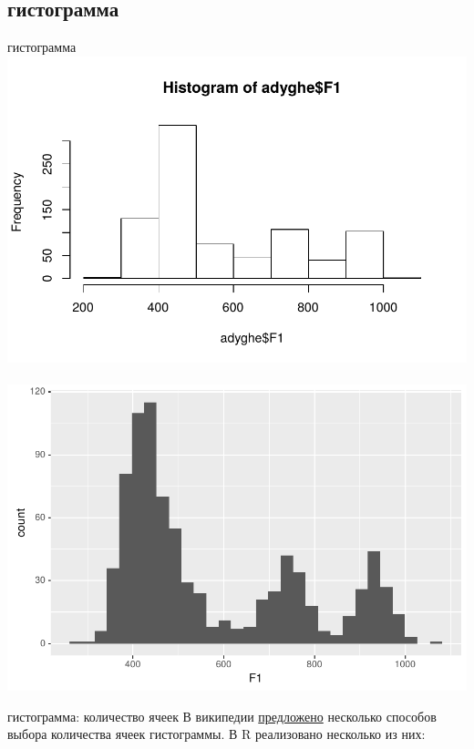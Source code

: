 \subsection{гистограмма}
\begin{frame}{гистограмма}
\includegraphics[width=0.49\linewidth]{040-base-density.pdf}~
\includegraphics[width=0.49\linewidth]{040-ggplot-density.pdf}
\end{frame}
\begin{frame}[fragile]{гистограмма: количество ячеек}
В википедии \href{https://en.wikipedia.org/wiki/Histogram#Number_of_bins_and_width}{\alert{предложено}} несколько способов выбора количества ячеек гистограммы. В R реализовано несколько из них:
\end{frame}
